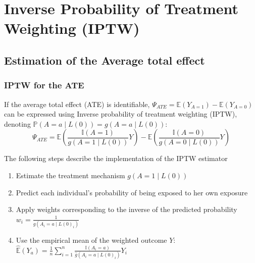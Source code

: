 \documentclass[
]{book}
\begin{document}
\hypertarget{chap_iptw}{%
\chapter{Inverse Probability of Treatment Weighting (IPTW)}\label{chap_iptw}}

\hypertarget{estimation-of-the-average-total-effect}{%
\section{Estimation of the Average total effect}\label{estimation-of-the-average-total-effect}}

\hypertarget{iptw-for-the-ate}{%
\subsection{IPTW for the ATE}\label{iptw-for-the-ate}}

If the average total effect (ATE) is identifiable, \(\Psi_{ATE} = \mathbb{E}(Y_{A=1}) - \mathbb{E}(Y_{A=0})\) can be expressed using Inverse probability of treatment weighting (IPTW), denoting \(\mathbb{P}(A=a \mid L(0)) = g(A=a \mid L(0))\):
\begin{equation}
\Psi_{ATE} = \mathbb{E}\left( \frac{\mathbb{I}(A=1)}{g(A=1 \mid L(0))} Y \right) - \mathbb{E}\left( \frac{\mathbb{I}(A=0)}{g(A=0 \mid L(0))} Y \right)
\end{equation}

The following steps describe the implementation of the IPTW estimator

\begin{enumerate}
\def\labelenumi{\arabic{enumi}.}
\item
  Estimate the treatment mechanism \(g(A=1 \mid L(0))\)
\item
  Predict each individual's probability of being exposed to her own exposure
\item
  Apply weights corresponding to the inverse of the predicted probability \(w_i = \frac{1}{\hat{g}(A_i = a \mid L(0)_i)}\)
\item
  Use the empirical mean of the weighted outcome \(Y\): \(\hat{\mathbb{E}}(Y_a) = \frac{1}{n} \sum_{i=1}^n \frac{\mathbb{I}(A_i=a)}{\hat{g}(A_i=a \mid L(0)_i)} Y_i\)
\end{enumerate}
\end{document}
